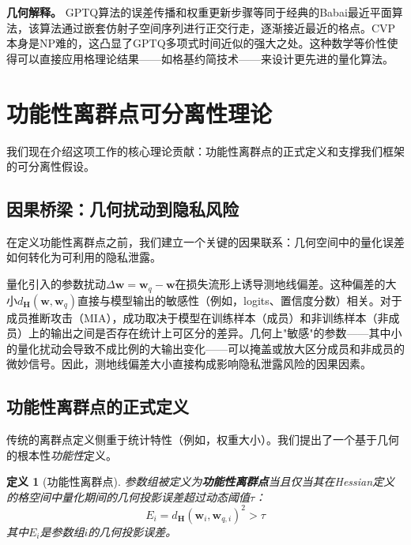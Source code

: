 \documentclass[letterpaper,twocolumn,10pt]{article}
\newtheorem{definition}{定义}
\begin{document}
\textbf{几何解释。} GPTQ算法的误差传播和权重更新步骤等同于经典的Babai最近平面算法，该算法通过嵌套仿射子空间序列进行正交行走，逐渐接近最近的格点。CVP本身是NP难的，这凸显了GPTQ多项式时间近似的强大之处。这种数学等价性使得可以直接应用格理论结果——如格基约简技术——来设计更先进的量化算法。

\section{功能性离群点可分离性理论}
\label{sec:theory}

我们现在介绍这项工作的核心理论贡献：功能性离群点的正式定义和支撑我们框架的可分离性假设。

\subsection{因果桥梁：几何扰动到隐私风险}

在定义功能性离群点之前，我们建立一个关键的因果联系：几何空间中的量化误差如何转化为可利用的隐私泄露。

量化引入的参数扰动$\Delta \mathbf{w} = \mathbf{w}_q - \mathbf{w}$在损失流形上诱导测地线偏差。这种偏差的大小$d_{\mathbf{H}}(\mathbf{w}, \mathbf{w}_q)$直接与模型输出的敏感性（例如，logits、置信度分数）相关。对于成员推断攻击（MIA）\cite{shokri2017membership}，成功取决于模型在训练样本（成员）和非训练样本（非成员）上的输出之间是否存在统计上可区分的差异。几何上"敏感"的参数——其中小的量化扰动会导致不成比例的大输出变化——可以掩盖或放大区分成员和非成员的微妙信号。因此，测地线偏差大小直接构成影响隐私泄露风险的因果因素。

\subsection{功能性离群点的正式定义}

传统的离群点定义侧重于统计特性（例如，权重大小）。我们提出了一个基于几何的根本性\emph{功能性}定义。

\begin{definition}[功能性离群点]
参数组被定义为\textbf{功能性离群点}当且仅当其在Hessian定义的格空间中量化期间的几何投影误差超过动态阈值$\tau$：
\begin{equation}
E_i = d_{\mathbf{H}}(\mathbf{w}_i, \mathbf{w}_{q,i})^2 > \tau
\end{equation}
其中$E_i$是参数组$i$的几何投影误差。
\end{definition}
\end{document}
